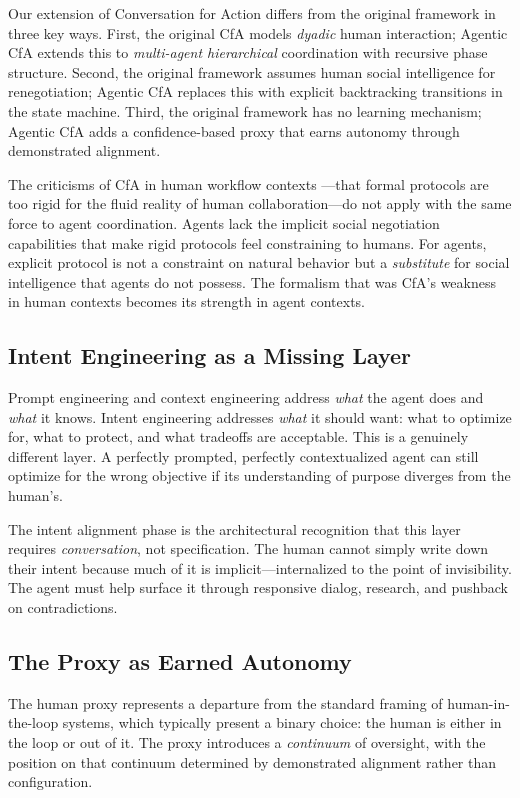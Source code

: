 \documentclass[11pt,a4paper]{article}
\begin{document}
Our extension of Conversation for Action differs from the original
framework in three key ways. First, the original CfA models
\emph{dyadic} human interaction; Agentic CfA extends this to
\emph{multi-agent hierarchical} coordination with recursive phase
structure. Second, the original framework assumes human social
intelligence for renegotiation; Agentic CfA replaces this with
explicit backtracking transitions in the state machine. Third,
the original framework has no learning mechanism; Agentic CfA adds
a confidence-based proxy that earns autonomy through demonstrated
alignment.

The criticisms of CfA in human workflow contexts
\citep{suchman1994plans}---that formal protocols are too rigid for
the fluid reality of human collaboration---do not apply with the
same force to agent coordination. Agents lack the implicit social
negotiation capabilities that make rigid protocols feel constraining
to humans. For agents, explicit protocol is not a constraint on
natural behavior but a \emph{substitute} for social intelligence
that agents do not possess. The formalism that was CfA's weakness
in human contexts becomes its strength in agent contexts.

\subsection{Intent Engineering as a Missing Layer}

Prompt engineering and context engineering address \emph{what} the
agent does and \emph{what} it knows. Intent engineering addresses
\emph{what} it should want: what to optimize for, what to protect,
and what tradeoffs are acceptable. This is a genuinely different
layer. A perfectly prompted, perfectly contextualized agent can
still optimize for the wrong objective if its understanding of
purpose diverges from the human's.

The intent alignment phase is the architectural recognition that
this layer requires \emph{conversation}, not specification. The
human cannot simply write down their intent because much of it is
implicit---internalized to the point of invisibility. The agent
must help surface it through responsive dialog, research, and
pushback on contradictions.

\subsection{The Proxy as Earned Autonomy}

The human proxy represents a departure from the standard framing
of human-in-the-loop systems, which typically present a binary
choice: the human is either in the loop or out of it. The proxy
introduces a \emph{continuum} of oversight, with the position on
that continuum determined by demonstrated alignment rather than
configuration.
\end{document}
